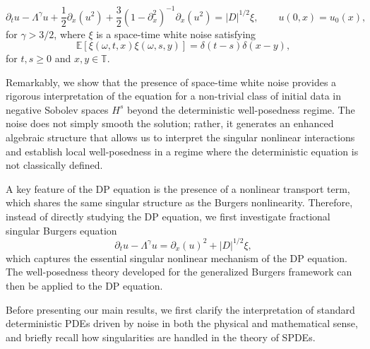 \documentclass{article}
\numberwithin{equation}{section}
\newcommand{\p}{\partial}
\begin{document}
\begin{equation}\label{eq;DP;Burgers-like}
    \p_tu-\Lambda^\gamma u+\frac12\partial_x(u^2)
    +\frac32(1-\partial_x^2)^{-1}\partial_x(u^2)
    =|D|^{1/2}\xi,
    \qquad u(0,x)=u_0(x),
\end{equation}
for $\gamma>3/2$, where $\xi$ is a space-time white noise satisfying
\begin{equation}\label{eq;white noise}
\mathbb E[\xi(\omega,t,x)\xi(\omega,s,y)]
=\delta(t-s)\delta(x-y),
\end{equation}
for $t,s\geq0$ and $x,y\in\mathbb T$.
\par Remarkably, we show that the presence of space-time white noise provides a rigorous interpretation of the equation for a non-trivial class of initial data in negative Sobolev spaces $H^s$ beyond the deterministic well-posedness regime. The noise does not simply smooth the solution; rather, it generates an enhanced algebraic structure that allows us to interpret the singular nonlinear interactions and establish local well-posedness in a regime where the deterministic equation is not classically defined.
\par  A key feature of the DP equation is the presence of a nonlinear transport term, which shares the same singular structure as the Burgers nonlinearity. Therefore, instead of directly studying the DP equation, we first investigate  fractional singular Burgers equation
\begin{equation}
    \p_t u-\Lambda^\gamma u=\p_x(u)^2+|D|^{1/2}\xi,
\end{equation}
which captures the essential singular nonlinear mechanism of the DP equation. The well-posedness theory developed for the generalized Burgers framework can then be applied to the DP equation. 
\par Before presenting our main results, we first clarify the interpretation of standard deterministic PDEs driven by noise in both the physical and mathematical sense, and briefly recall how singularities are handled in the theory of SPDEs.
\end{document}
